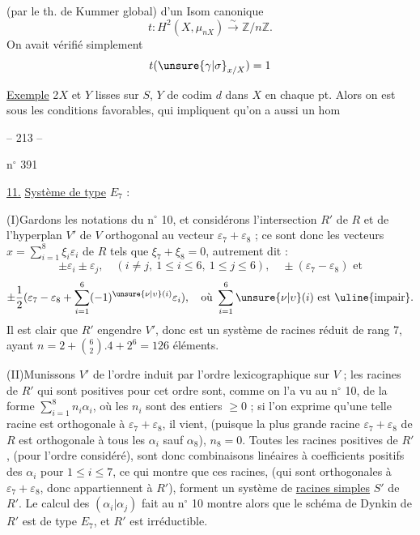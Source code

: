 (par le th. de Kummer global) d'un Isom canonique
\[
t:H^2(X,\mu_{nX})\overset{\sim}{\longrightarrow}\mathbb Z/n\mathbb Z.
\]
On avait vérifié simplement
\[
t(\unsure{\gamma|\sigma}_{x/X})=1
\]

\uline{Exemple} 2\quad $X$ et $Y$ lisses sur $S$,
$Y$ de codim $d$ dans $X$ en chaque pt.
Alors on est sous les conditions favorables, qui impliquent qu'on a
aussi un hom

\begin{center}-- 213 --\end{center}
\hfill n$^\circ$ 391

\uline{11.} \uline{Système de type} $E_7$ :

(I)\quad Gardons les notations du n$^\circ$ 10, et considérons l'intersection $R'$
de $R$ et de l'hyperplan $V'$ de $V$ orthogonal au vecteur
$\varepsilon_7+\varepsilon_8$ ; ce sont donc les vecteurs
$x=\sum_{i=1}^8\xi_i\varepsilon_i$ de $R$ tels que $\xi_7+\xi_8=0$,
autrement dit :
\[
\pm\varepsilon_i\pm\varepsilon_j,\quad
(i\neq j,\ 1\leq i\leq6,\ 1\leq j\leq6),\quad
\pm(\varepsilon_7-\varepsilon_8)\text{ et}
\]
\[
\pm\frac12(\varepsilon_7-\varepsilon_8+
\sum_{i=1}^6(-1)^{\unsure{\nu|\upsilon}(i)}\varepsilon_i),
\quad\text{où }\sum_{i=1}^6\unsure{\nu|\upsilon}(i)\text{ est \uline{impair}.}
\]
Il est clair que $R'$ engendre $V'$, donc est un système de racines réduit
de rang 7, ayant $n=2+\binom62.4+2^6=126$ éléments.

(II)\quad Munissons $V'$ de l'ordre induit par l'ordre lexicographique sur $V$ ;
les racines de $R'$ qui sont positives pour cet ordre sont, comme on l'a vu au
n$^\circ$ 10, de la forme $\sum_{i=1}^8n_i\alpha_i$, où les $n_i$ sont des entiers
$\geq0$ ; si l'on exprime qu'une telle racine est orthogonale à
$\varepsilon_7+\varepsilon_8$, il vient, (puisque la plus grande racine
$\varepsilon_7+\varepsilon_8$ de $R$ est orthogonale à tous les $\alpha_i$
sauf $\alpha_8$), $n_8=0$. Toutes les racines positives de $R'$,
(pour l'ordre considéré), sont donc combinaisons linéaires à coefficients positifs
des $\alpha_i$ pour $1\leq i\leq7$, ce qui montre que ces racines,
(qui sont orthogonales à $\varepsilon_7+\varepsilon_8$, donc appartiennent à $R'$),
forment un système de \uline{racines simples} $S'$ de $R'$.
Le calcul des $(\alpha_i|\alpha_j)$ fait au n$^\circ$ 10 montre alors que le
schéma de Dynkin de $R'$ est de type $E_7$, et $R'$ est irréductible.

